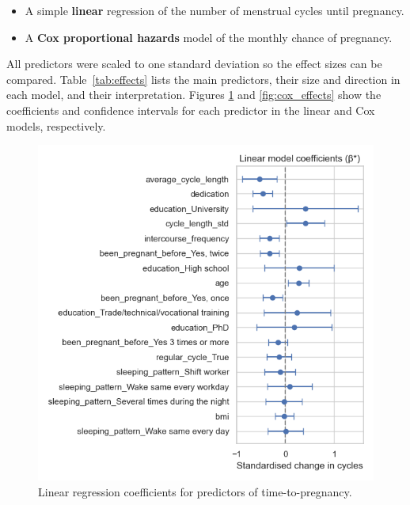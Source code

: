 \documentclass[11pt,a4paper]{article}
\begin{document}
\begin{itemize}
  \item A simple \textbf{linear} regression of the number of menstrual cycles until pregnancy.
  \item A \textbf{Cox proportional hazards} \cite{cox1972} model of the monthly chance of pregnancy.
\end{itemize}
All predictors were scaled to one standard deviation so the effect sizes can be compared.
Table~\ref{tab:effects} lists the main predictors, their size and direction in each model, and their interpretation.
Figures \ref{fig:linear_effects} and \ref{fig:cox_effects} show the coefficients and confidence intervals for each predictor in the linear and Cox models, respectively.
\begin{figure}[htbp]
\centering
\includegraphics[width=0.8\linewidth]{../results/linear_model_coefficients.png}
\caption{Linear regression coefficients for predictors of time-to-pregnancy.}
\label{fig:linear_effects}
\end{figure}
\end{document}
